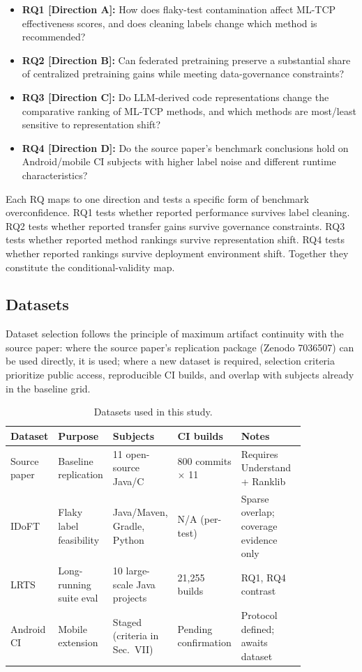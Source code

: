 \documentclass[conference]{IEEEtran}
\begin{document}
\begin{itemize}[leftmargin=*]
\item \textbf{RQ1 [Direction A]:} How does flaky-test contamination affect ML-TCP effectiveness scores, and does cleaning labels change which method is recommended?
\item \textbf{RQ2 [Direction B]:} Can federated pretraining preserve a substantial share of centralized pretraining gains while meeting data-governance constraints?
\item \textbf{RQ3 [Direction C]:} Do LLM-derived code representations change the comparative ranking of ML-TCP methods, and which methods are most/least sensitive to representation shift?
\item \textbf{RQ4 [Direction D]:} Do the source paper's benchmark conclusions hold on Android/mobile CI subjects with higher label noise and different runtime characteristics?
\end{itemize}

Each RQ maps to one direction and tests a specific form of benchmark overconfidence. RQ1 tests whether reported performance survives label cleaning. RQ2 tests whether reported transfer gains survive governance constraints. RQ3 tests whether reported method rankings survive representation shift. RQ4 tests whether reported rankings survive deployment environment shift. Together they constitute the conditional-validity map.


\subsection{Datasets}

Dataset selection follows the principle of maximum artifact continuity with the source paper: where the source paper's replication package (Zenodo 7036507) can be used directly, it is used; where a new dataset is required, selection criteria prioritize public access, reproducible CI builds, and overlap with subjects already in the baseline grid.


\begin{table}[t]
\caption{Datasets used in this study.}
\centering
\begin{tabular}{@{}p{0.15\linewidth}p{0.12\linewidth}p{0.20\linewidth}p{0.12\linewidth}p{0.25\linewidth}@{}}
\toprule
\textbf{Dataset} & \textbf{Purpose} & \textbf{Subjects} & \textbf{CI builds} & \textbf{Notes} \\
\midrule
Source paper \cite{zhao2023} & Baseline replication & 11 open-source Java/C & 800 commits ${\times}$ 11 & Requires Understand + Ranklib \\
IDoFT \cite{lam2019} & Flaky label feasibility & Java/Maven, Gradle, Python & N/A (per-test) & Sparse overlap; coverage evidence only \\
LRTS \cite{lrts2024} & Long-running suite eval & 10 large-scale Java projects & 21,255 builds & RQ1, RQ4 contrast \\
Android CI & Mobile extension & Staged (criteria in Sec.~VII) & Pending confirmation & Protocol defined; awaits dataset \\
\bottomrule
\end{tabular}
\end{table}
\end{document}
